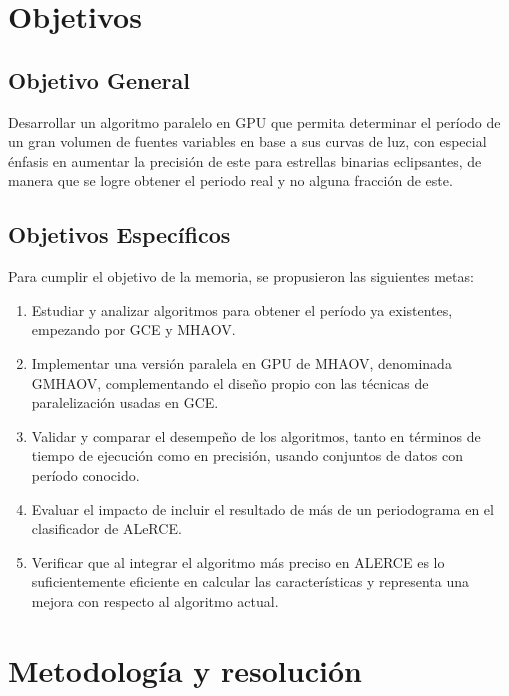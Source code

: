 \section{Objetivos}\label{sec:objetivos}

  \subsection*{Objetivo General}\label{sec:obj-g}
  Desarrollar un algoritmo paralelo en GPU que permita determinar el período de un gran volumen de fuentes variables en base a sus curvas de luz, con especial énfasis en aumentar la precisión de este para estrellas binarias eclipsantes, de manera que se logre obtener el periodo real y no alguna fracción de este.

  \subsection*{Objetivos Específicos}\label{sec:obj-e}
  Para cumplir el objetivo de la memoria, se propusieron las siguientes metas:
  \begin{enumerate}
  \item Estudiar y analizar algoritmos para obtener el período ya existentes, empezando por GCE y MHAOV.
  \item Implementar una versión paralela en GPU de MHAOV, denominada GMHAOV, complementando el diseño propio con las técnicas de paralelización usadas en GCE.
  \item Validar y comparar el desempeño de los algoritmos, tanto en términos de tiempo de ejecución como en precisión, usando conjuntos de datos con período conocido.
  \item Evaluar el impacto de incluir el resultado de más de un periodograma  en el clasificador de ALeRCE.
  \item Verificar que al integrar el algoritmo más preciso  en ALERCE es lo suficientemente eficiente en calcular las características y representa una mejora con respecto al algoritmo actual.

  \end{enumerate}
\section{Metodología y resolución}\label{chap:sol}

